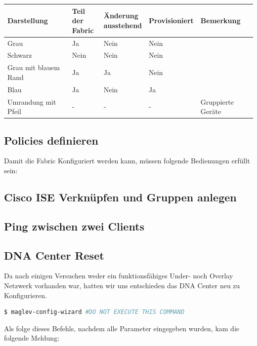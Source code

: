 \begin{tabular}{| l | l | l | l | l |}
	\textbf{Darstellung} & \makecell{\textbf{Teil der}\\ \textbf{Fabric}} & \makecell{\textbf{Änderung}\\ \textbf{ausstehend}} & \textbf{Provisioniert} & \textbf{Bemerkung} \\
	\hline
	Grau & Ja & Nein & Nein & \\
	Schwarz & Nein & Nein & Nein & \\
	Grau mit blauem Rand & Ja & Ja & Nein & \\
	Blau & Ja & Nein & Ja & \\
	Umrandung mit Pfeil & - & - & - & Gruppierte Geräte\\	

\end{tabular}

\subsection{Policies definieren}
Damit die Fabric Konfiguriert werden kann, müssen folgende Bedienungen erfüllt sein:





\subsection{Cisco ISE Verknüpfen und Gruppen anlegen}

\subsection{Ping zwischen zwei Clients}

\subsection{DNA Center Reset}
Da nach einigen Versuchen weder ein funktionsfähiges Under- noch Overlay Netzwerk vorhanden war, hatten wir uns entschieden das DNA Center neu zu Konfigurieren.

\begin{lstlisting}[language=bash]
$ maglev-config-wizard #DO NOT EXECUTE THIS COMMAND
\end{lstlisting}

Als folge dieses Befehls, nachdem alle Parameter eingegeben wurden, kam die folgende Meldung:


